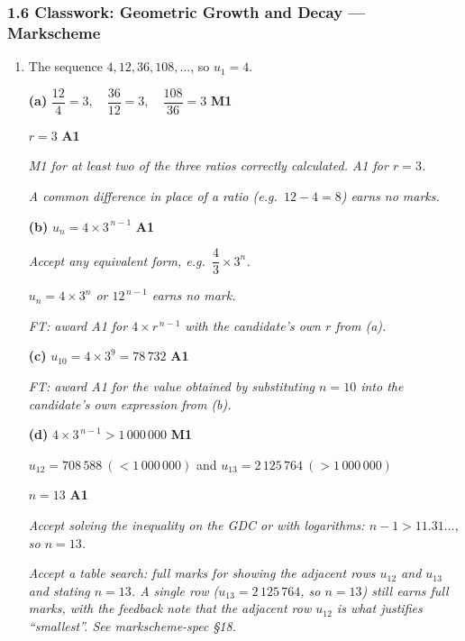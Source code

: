 \documentclass[12pt, twoside]{article}
\begin{document}
\subsubsection*{1.6 Classwork: Geometric Growth and Decay --- Markscheme}

\begin{enumerate}[itemsep=0.3cm]

\item[1.] [Maximum mark: 6]

The sequence $4, 12, 36, 108, \ldots$, so $u_{1} = 4$.

\medskip

\textbf{(a)} $\dfrac{12}{4} = 3, \quad \dfrac{36}{12} = 3, \quad
\dfrac{108}{36} = 3$ \hfill \textbf{M1}

$r = 3$ \hfill \textbf{A1}

\emph{M1 for at least two of the three ratios correctly calculated.
A1 for $r = 3$.}

\emph{A common difference in place of a ratio (e.g.\ $12 - 4 = 8$)
earns no marks.}

\medskip

\textbf{(b)} $u_{n} = 4 \times 3^{\,n - 1}$ \hfill \textbf{A1}

\emph{Accept any equivalent form, e.g.\ $\dfrac{4}{3} \times 3^{n}$.}

\emph{$u_{n} = 4 \times 3^{n}$ or $12^{\,n-1}$ earns no mark.}

\emph{FT: award A1 for $4 \times r^{\,n-1}$ with the candidate's own
$r$ from (a).}

\medskip

\textbf{(c)} $u_{10} = 4 \times 3^{9} = 78\,732$ \hfill \textbf{A1}

\emph{FT: award A1 for the value obtained by substituting $n = 10$
into the candidate's own expression from (b).}

\medskip

\textbf{(d)} $4 \times 3^{\,n - 1} > 1\,000\,000$ \hfill \textbf{M1}

$u_{12} = 708\,588 \ (< 1\,000\,000)$ \quad and \quad
$u_{13} = 2\,125\,764 \ (> 1\,000\,000)$

$n = 13$ \hfill \textbf{A1}

\emph{Accept solving the inequality on the GDC or with logarithms:
$n - 1 > 11.31\ldots$, so $n = 13$.}

\emph{Accept a table search: full marks for showing the adjacent rows
$u_{12}$ and $u_{13}$ and stating $n = 13$. A single row
($u_{13} = 2\,125\,764$, so $n = 13$) still earns full marks, with the
feedback note that the adjacent row $u_{12}$ is what justifies
``smallest''. See markscheme-spec §18.}


\end{enumerate}
\end{document}
